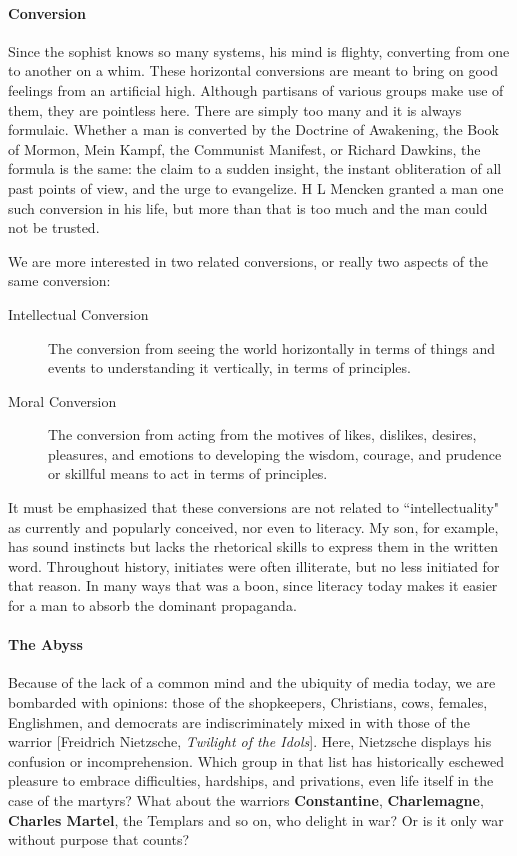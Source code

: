 \paragraph{Conversion}
Since the sophist knows so many systems, his mind is flighty, converting from one to another on a whim. These horizontal conversions are meant to bring on good feelings from an artificial high. Although partisans of various groups make use of them, they are pointless here. There are simply too many and it is always formulaic. Whether a man is converted by the Doctrine of Awakening, the Book of Mormon, Mein Kampf, the Communist Manifest, or Richard Dawkins, the formula is the same: the claim to a sudden insight, the instant obliteration of all past points of view, and the urge to evangelize. H L Mencken granted a man one such conversion in his life, but more than that is too much and the man could not be trusted.

We are more interested in two related conversions, or really two aspects of the same conversion:

\begin{description}
\item[Intellectual Conversion ]

The conversion from seeing the world horizontally in terms of things and events to understanding it vertically, in terms of principles. 

\item[Moral Conversion ]

The conversion from acting from the motives of likes, dislikes, desires, pleasures, and emotions to developing the wisdom, courage, and prudence or skillful means to act in terms of principles. 

\end{description}
It must be emphasized that these conversions are not related to ``intellectuality" as currently and popularly conceived, nor even to literacy. My son, for example, has sound instincts but lacks the rhetorical skills to express them in the written word. Throughout history, initiates were often illiterate, but no less initiated for that reason. In many ways that was a boon, since literacy today makes it easier for a man to absorb the dominant propaganda.

\paragraph{The Abyss}
Because of the lack of a common mind and the ubiquity of media today, we are bombarded with opinions: those of the shopkeepers, Christians, cows, females, Englishmen, and democrats are indiscriminately mixed in with those of the warrior [Freidrich Nietzsche, \emph{Twilight of the Idols}]. Here, Nietzsche displays his confusion or incomprehension. Which group in that list has historically eschewed pleasure to embrace difficulties, hardships, and privations, even life itself in the case of the martyrs? What about the warriors \textbf{Constantine}, \textbf{Charlemagne}, \textbf{Charles Martel}, the Templars and so on, who delight in war? Or is it only war without purpose that counts?

